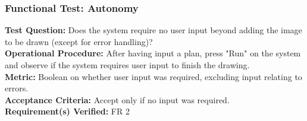 \subsubsection{Functional Test: Autonomy}
\label{test:sdp_ft_autonomy}
\textbf{Test Question:} Does the system require no user input beyond adding the image to be drawn (except for error handling)? \\
\textbf{Operational Procedure:}  After having input a plan, press "Run" on the system and observe if the system requires user input to finish the drawing. \\
\textbf{Metric:} Boolean on whether user input was required, excluding input relating to errors.\\
\textbf{Acceptance Criteria:} Accept only if no input was required.\\
\textbf{Requirement(s) Verified:} FR 2 \\
